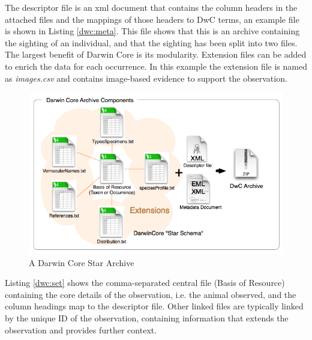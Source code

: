 

The descriptor file is an xml document that contains the column headers in the attached files and the mappings of those headers to DwC terms, an example file is shown in Listing \ref{dwc:meta}. This file shows that this is an archive containing the sighting of an individual, and that the sighting has been split into two files. The largest benefit of Darwin Core is its modularity. Extension files can be added to enrich the data for each occurrence. In this example the extension file is named as \textit{images.csv} and contains image-based evidence to support the observation.

\noindent\begin{minipage}{\textwidth}

\end{minipage}

    \begin{figure}
    \centering
      \includegraphics[width=\textwidth]{Chap5/figures/dwca.png}
    \caption{A Darwin Core Star Archive}
    \label{dwca}
    \end{figure}

Listing \ref{dwc:set} shows the comma-separated central file (Basis of Resource) containing the core details of the observation, i.e. the animal observed, and the column headings map to the descriptor file. Other linked files are typically linked by the unique ID of the observation, containing information that extends the observation and provides further context.

\noindent\begin{minipage}{\textwidth}

\end{minipage}


